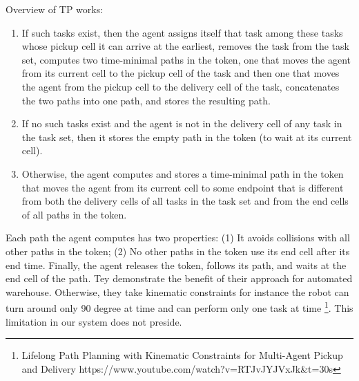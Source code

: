 Overview of TP works:
\begin{enumerate}
    \item If such tasks exist, then the agent
    assigns itself that task among these tasks whose pickup cell
    it can arrive at the earliest, removes the task from the task
    set, computes two time-minimal paths in the token, one that
    moves the agent from its current cell to the pickup cell of
    the task and then one that moves the agent from the pickup
    cell to the delivery cell of the task, concatenates the two
    paths into one path, and stores the resulting path.

    \item If no such tasks exist and the agent is not in the delivery cell
    of any task in the task set, then it stores the empty path in
    the token (to wait at its current cell).

    \item Otherwise, the
    agent computes and stores a time-minimal path in the token
    that moves the agent from its current cell to some endpoint
    that is different from both the delivery cells of all tasks in
    the task set and from the end cells of all paths in the token.
\end{enumerate}
Each path the
agent computes has two properties: (1) It avoids collisions
with all other paths in the token; (2) No other paths in the
token use its end cell after its end time. Finally, the agent
releases the token, follows its path, and waits at the end cell
of the path.
Tey demonstrate the benefit of their approach for automated warehouse.
Otherwise, they take kinematic constraints for instance the robot can turn around only 90 degree at time
and can perform only one task at time \footnote{Lifelong Path Planning with Kinematic Constraints for Multi-Agent Pickup and Delivery https://www.youtube.com/watch?v=RTJvJYJVxJk\&t=30s}. 
This limitation in our system does not preside.

